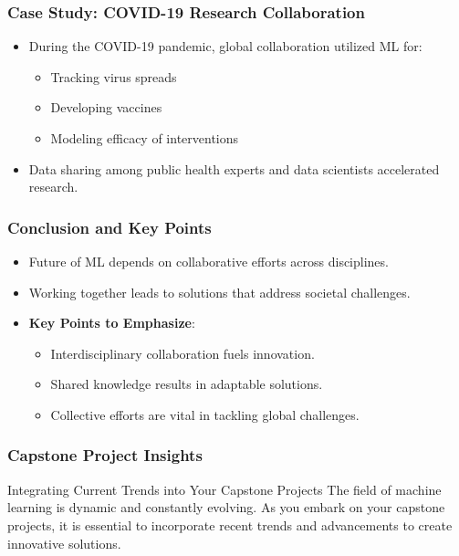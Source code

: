 \documentclass[aspectratio=169]{beamer}
\begin{document}
\begin{frame}[fragile]
    \frametitle{Case Study: COVID-19 Research Collaboration}
    \begin{itemize}
        \item During the COVID-19 pandemic, global collaboration utilized ML for:
            \begin{itemize}
                \item Tracking virus spreads
                \item Developing vaccines
                \item Modeling efficacy of interventions
            \end{itemize}
        \item Data sharing among public health experts and data scientists accelerated research.
    \end{itemize}
\end{frame}

\begin{frame}[fragile]
    \frametitle{Conclusion and Key Points}
    \begin{itemize}
        \item Future of ML depends on collaborative efforts across disciplines.
        \item Working together leads to solutions that address societal challenges.
        \item \textbf{Key Points to Emphasize}:
            \begin{itemize}
                \item Interdisciplinary collaboration fuels innovation.
                \item Shared knowledge results in adaptable solutions.
                \item Collective efforts are vital in tackling global challenges.
            \end{itemize}
    \end{itemize}
\end{frame}

\begin{frame}[fragile]
    \frametitle{Capstone Project Insights}
    \begin{block}{Integrating Current Trends into Your Capstone Projects}
        The field of machine learning is dynamic and constantly evolving. 
        As you embark on your capstone projects, it is essential to incorporate recent trends and advancements to create innovative solutions.
    \end{block}
\end{frame}
\end{document}
